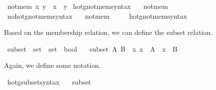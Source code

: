 \begin{isabellebody}
\isamarkupfalse%
\ {\isachardoublequoteopen}not{\isacharunderscore}{\kern0pt}mem\ x\ y\ {\isasymequiv}\ {\isasymnot}{\isacharparenleft}{\kern0pt}x\ {\isasymin}\ y{\isacharparenright}{\kern0pt}{\isachardoublequoteclose}\isanewline
\isanewline
{}\isamarkupfalse%
\ hotg{\isacharunderscore}{\kern0pt}not{\isacharunderscore}{\kern0pt}mem{\isacharunderscore}{\kern0pt}syntax\ \ \isamarkupfalse%
\ not{\isacharunderscore}{\kern0pt}mem\ {\isacharparenleft}{\kern0pt}\ {\isachardoublequoteopen}{\isasymnotin}{\isachardoublequoteclose}\ {}{}{\isacharparenright}{\kern0pt}\ \isamarkupfalse%
\isanewline
{}\isamarkupfalse%
\ no{\isacharunderscore}{\kern0pt}hotg{\isacharunderscore}{\kern0pt}not{\isacharunderscore}{\kern0pt}mem{\isacharunderscore}{\kern0pt}syntax\ \ \isamarkupfalse%
\ not{\isacharunderscore}{\kern0pt}mem\ {\isacharparenleft}{\kern0pt}\ {\isachardoublequoteopen}{\isasymnotin}{\isachardoublequoteclose}\ {}{}{\isacharparenright}{\kern0pt}\ \isamarkupfalse%
\isanewline
\isanewline
{}\isamarkupfalse%
\ hotg{\isacharunderscore}{\kern0pt}not{\isacharunderscore}{\kern0pt}mem{\isacharunderscore}{\kern0pt}syntax%
\begin{isamarkuptext}%
Based on the membership relation, we can define the subset relation.%
\end{isamarkuptext}\isamarkuptrue%
\isamarkupfalse%
\ subset\ {\isacharcolon}{\kern0pt}{\isacharcolon}{\kern0pt}\ {\isacartoucheopen}set\ {\isasymRightarrow}\ set\ {\isasymRightarrow}\ bool{\isacartoucheclose}\isanewline
\ \ \ {\isachardoublequoteopen}subset\ A\ B\ {\isasymequiv}\ {\isasymforall}x{\isachardot}{\kern0pt}\ x\ {\isasymin}\ A\ {\isasymlongrightarrow}\ x\ {\isasymin}\ B{\isachardoublequoteclose}%
\begin{isamarkuptext}%
Again, we define some notation.%
\end{isamarkuptext}\isamarkuptrue%
\isamarkupfalse%
\ hotg{\isacharunderscore}{\kern0pt}subset{\isacharunderscore}{\kern0pt}syntax\ \ \isamarkupfalse%
\ subset\ {\isacharparenleft}{\kern0pt}\ {\isachardoublequoteopen}{\isasymsubseteq}{\isachardoublequoteclose}\ {}{}{\isacharparenright}{\kern0pt}\ \isamarkupfalse%

\end{isabellebody}
